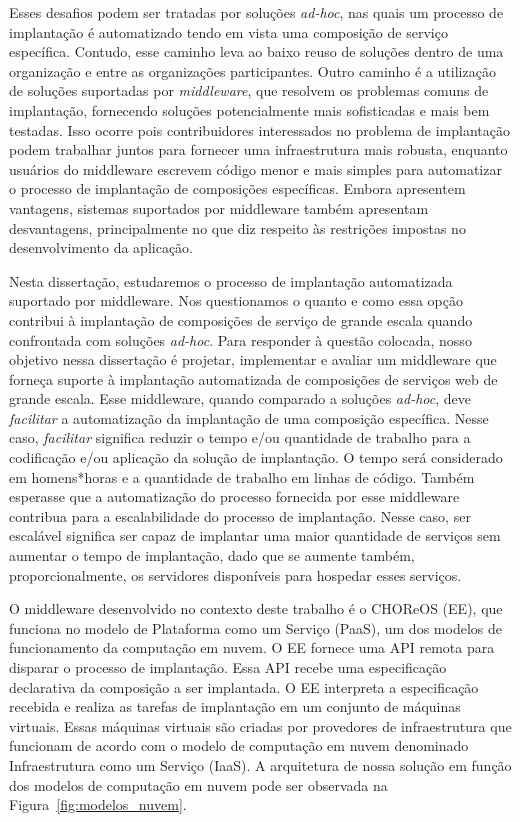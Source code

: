 Esses desafios podem ser tratadas por soluções \emph{ad-hoc},
nas quais um processo de implantação é automatizado tendo em vista
uma composição de serviço específica.
Contudo, esse caminho leva ao baixo reuso de soluções
dentro de uma organização e entre as organizações participantes.
Outro caminho é a utilização de soluções suportadas por \emph{middleware},
que resolvem os problemas comuns de implantação,
fornecendo soluções potencialmente mais sofisticadas e mais bem testadas.
Isso ocorre pois contribuidores interessados no problema de implantação
podem trabalhar juntos para fornecer uma infraestrutura mais robusta,
enquanto usuários do middleware escrevem código menor e mais simples
para automatizar o processo de implantação de composições específicas.
Embora apresentem vantagens, sistemas suportados por middleware
também apresentam desvantagens, principalmente no que diz respeito
às restrições impostas no desenvolvimento da aplicação.

Nesta dissertação, estudaremos o processo de implantação automatizada suportado por middleware. 
Nos questionamos o quanto e como essa opção
contribui à implantação de composições de serviço de grande escala
quando confrontada com soluções \emph{ad-hoc}.
Para responder à questão colocada, nosso objetivo nessa dissertação é 
projetar, implementar e avaliar
um middleware que forneça suporte à implantação automatizada de composições de serviços web
de grande escala.
Esse middleware, quando comparado a soluções \emph{ad-hoc},
deve \emph{facilitar} a automatização da implantação de uma composição específica.
Nesse caso, \emph{facilitar} significa reduzir o tempo e/ou quantidade de trabalho
para a codificação e/ou aplicação da solução de implantação.
O tempo será considerado em homens*horas e a quantidade de trabalho
em linhas de código.
Também esperasse que a automatização do processo fornecida por esse middleware
contribua para a escalabilidade do processo de implantação.
Nesse caso, ser escalável significa ser capaz de implantar uma maior quantidade
de serviços sem aumentar o tempo de implantação, dado que se aumente também,
proporcionalmente, os servidores disponíveis para hospedar esses serviços.

O middleware desenvolvido no contexto deste trabalho é o CHOReOS \ee (EE),
que funciona no modelo de Plataforma como um Serviço (PaaS), 
um dos modelos de funcionamento da computação em nuvem.
O EE fornece uma API remota para disparar o processo de implantação.
Essa API recebe uma especificação declarativa da composição a ser implantada.
O EE interpreta a especificação recebida e realiza as tarefas de implantação
em um conjunto de máquinas virtuais.
Essas máquinas virtuais são criadas por provedores de infraestrutura que funcionam
de acordo com o modelo de computação em nuvem denominado Infraestrutura como um Serviço (IaaS).
A arquitetura de nossa solução em função dos modelos de computação em nuvem pode ser observada na Figura~\ref{fig:modelos_nuvem}.

